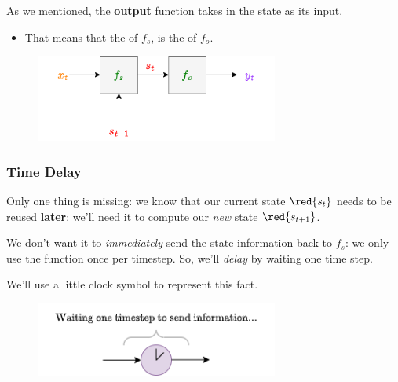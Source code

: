             As we mentioned, the \textbf{output} function takes in the state as its input. 
            
            \begin{itemize}
                \item That means that the  of $f_s$, is the  of $f_o$.
            \end{itemize}
            
            \begin{figure}[H]
                \centering
                \includegraphics[width=80mm,scale=0.4]{images/rnn_images/state_machine_protodiagram.png}
            \end{figure}
            
        \subsecdiv
        
        \subsubsection{Time Delay}
        
            Only one thing is missing: we know that our current state $\red{s_t}$ needs to be reused \textbf{later}: we'll need it to compute our \textit{new} state $\red{s_{t+1}}$.
            
            We don't want it to \textit{immediately} send the state information back to $f_s$: we only use the function once per timestep. So, we'll \textit{delay} by waiting one time step.
            
            We'll use a little clock symbol to represent this fact.
            
            \begin{figure}[H]
                \centering
                \includegraphics[width=80mm,scale=0.4]{images/rnn_images/clock.png}
            \end{figure}
            
